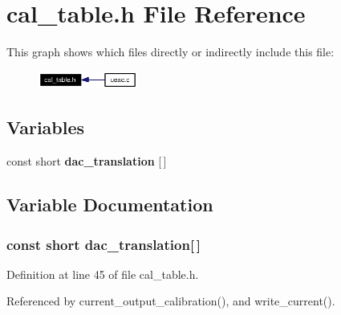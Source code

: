 \section{cal\_\-table.h File Reference}
\label{cal__table_8h}


This graph shows which files directly or indirectly include this file:\begin{figure}[H]
\begin{center}
\leavevmode
\includegraphics[width=92pt]{cal__table_8h__dep__incl}
\end{center}
\end{figure}
\subsection*{Variables}
\begin{CompactItemize}
\item 
const short {\bf dac\_\-translation} [$\,$]
\end{CompactItemize}


\subsection{Variable Documentation}
\subsubsection{\setlength{\rightskip}{0pt plus 5cm}const short {\bf dac\_\-translation}[$\,$]}\label{cal__table_8h_a0}




Definition at line 45 of file cal\_\-table.h.

Referenced by current\_\-output\_\-calibration(), and write\_\-current().
